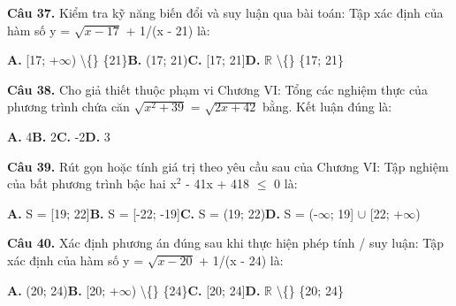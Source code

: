 \documentclass[11pt,a4paper]{article}
\begin{document}
\textbf{\color{primary} Câu 37.} Kiểm tra kỹ năng biến đổi và suy luận qua bài toán: Tập xác định của hàm số y = $\sqrt{x - 17}$ + 1/(x - 21) là:\par
\hspace*{1.5em}\textbf{A.} [17; +$\infty$) \textbackslash\{\} \{21\}\quad\quad \textbf{B.} (17; 21)\quad\quad \textbf{C.} [17; 21]\quad\quad \textbf{D.} $\mathbb{R}$ \textbackslash\{\} \{17; 21\}\par\vspace{2pt}
\textbf{\color{primary} Câu 38.} Cho giả thiết thuộc phạm vi Chương VI: Tổng các nghiệm thực của phương trình chứa căn $\sqrt{x^2 + 39}$ = $\sqrt{2x + 42}$ bằng. Kết luận đúng là:\par
\hspace*{1.5em}\textbf{A.} 4\quad\quad \textbf{B.} 2\quad\quad \textbf{C.} -2\quad\quad \textbf{D.} 3\par\vspace{2pt}
\textbf{\color{primary} Câu 39.} Rút gọn hoặc tính giá trị theo yêu cầu sau của Chương VI: Tập nghiệm của bất phương trình bậc hai x$^2$ - 41x + 418 $\le$ 0 là:\par
\hspace*{1.5em}\textbf{A.} S = [19; 22]\quad\quad \textbf{B.} S = [-22; -19]\quad\quad \textbf{C.} S = (19; 22)\quad\quad \textbf{D.} S = (-$\infty$; 19] $\cup$ [22; +$\infty$)\par\vspace{2pt}
\textbf{\color{primary} Câu 40.} Xác định phương án đúng sau khi thực hiện phép tính / suy luận: Tập xác định của hàm số y = $\sqrt{x - 20}$ + 1/(x - 24) là:\par
\hspace*{1.5em}\textbf{A.} (20; 24)\quad\quad \textbf{B.} [20; +$\infty$) \textbackslash\{\} \{24\}\quad\quad \textbf{C.} [20; 24]\quad\quad \textbf{D.} $\mathbb{R}$ \textbackslash\{\} \{20; 24\}\par\vspace{2pt}
\end{document}
